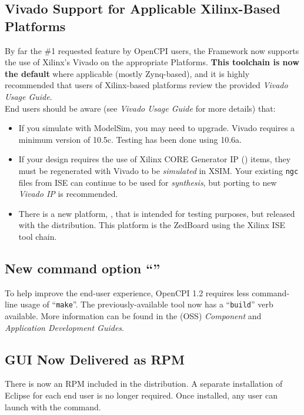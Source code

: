 \subsection{Vivado Support for Applicable Xilinx-Based Platforms} %
\label{sec:12_vivado}
By far the \#1 requested feature by OpenCPI users, the Framework now supports the use of Xilinx's Vivado on the appropriate Platforms. \textbf{This toolchain is now the default} where applicable (mostly Zynq-based), and it is highly recommended that users of Xilinx-based platforms review the provided \textit{Vivado Usage Guide}.\\

End users should be aware (see \textit{Vivado Usage Guide} for more details) that:
\begin{itemize}
\setlength\itemsep{0em} %
\item If you simulate with ModelSim, you may need to upgrade. Vivado requires a minimum version of 10.5c. Testing has been done using 10.6a.
\item If your design requires the use of Xilinx CORE Generator IP () items, they must be regenerated with Vivado to be \textit{simulated} in XSIM. Your existing \texttt{ngc} files from ISE can continue to be used for \textit{synthesis}, but porting to new \textit{Vivado IP} is recommended.
\item There is a new platform, , that is intended for testing purposes, but released with the distribution. This platform is the ZedBoard using the Xilinx ISE tool chain.
\end{itemize}

\subsection{New command option ``''} %
To help improve the end-user experience, OpenCPI 1.2 requires less command-line usage of ``\texttt{make}''. The previously-available tool \ocpidev now has a ``\texttt{build}'' verb available. More information can be found in the (OSS) \textit{Component} and \textit{Application Development Guides}.

\subsection{GUI Now Delivered as RPM} %
\label{sec:12_guirpm}
There is now an  RPM included in the distribution. A separate installation of Eclipse for each end user is no longer required. Once installed, any user can launch with the  command.

